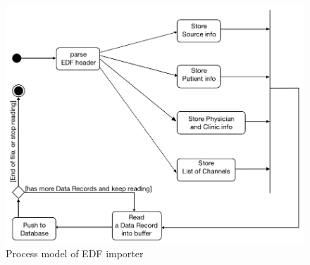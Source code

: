 \begin{figure}[ht]
    \centering
    \includegraphics[width=1.0\textwidth]{Figures/EDFImporter.png}
    \caption{Process model of EDF importer}
    \label{fig:Figures/EDFImporter}
\end{figure}
